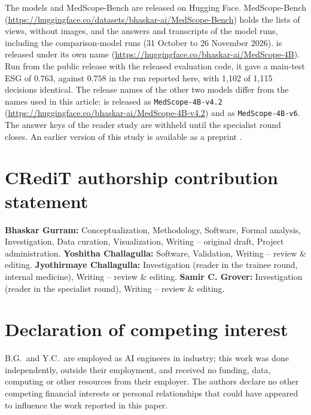 {\raggedright
The models and MedScope-Bench are released on Hugging Face. MedScope-Bench (\url{https://huggingface.co/datasets/bhaskar-ai/MedScope-Bench}) holds the lists of views, without images, and the answers and transcripts of the model runs, including the comparison-model runs (31 October to 26 November 2026). \ms{} is released under its own name (\url{https://huggingface.co/bhaskar-ai/MedScope-4B}). Run from the public release with the released evaluation code, it gave a main-test ESG of $0.763$, against $0.758$ in the run reported here, with 1,102 of 1,115 decisions identical. The release names of the other two models differ from the names used in this article: \msp{} is released as \texttt{MedScope-4B-v4.2} (\url{https://huggingface.co/bhaskar-ai/MedScope-4B-v4.2}) and \msn{} as \texttt{MedScope-4B-v6}.  The answer keys of the reader study are withheld until the specialist round closes. An earlier version of this study is available as a preprint \citep{gurram2026medscope}.
\par}

\section*{CRediT authorship contribution statement}
\textbf{Bhaskar Gurram:} Conceptualization, Methodology, Software, Formal analysis, Investigation, Data curation, Visualization, Writing -- original draft, Project administration.
\textbf{Yoshitha Challagulla:} Software, Validation, Writing -- review \& editing.
\textbf{Jyothirmaye Challagulla:} Investigation (reader in the trainee round, internal medicine), Writing -- review \& editing.
\textbf{Samir C. Grover:} Investigation (reader in the specialist round), Writing -- review \& editing.

\section*{Declaration of competing interest}
B.G.\ and Y.C.\ are employed as AI engineers in industry; this work was done independently, outside their employment, and received no funding, data, computing or other resources from their employer. The authors declare no other competing financial interests or personal relationships that could have appeared to influence the work reported in this paper. 

